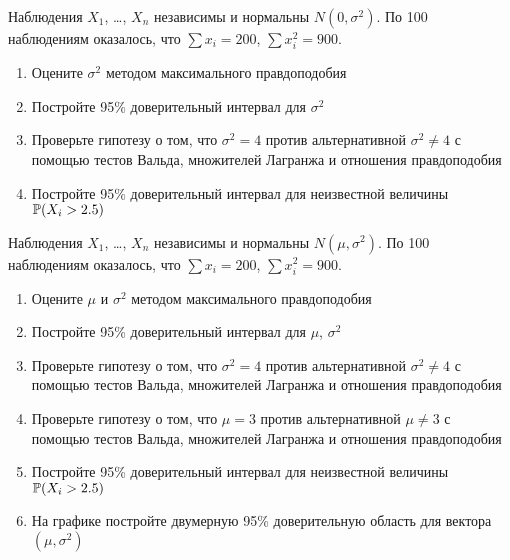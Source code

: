 \documentclass[pdftex,11pt,openany]{book}\usepackage[]{graphicx}\usepackage[]{color}
\begin{document}
\begin{solution}
\end{solution}


\begin{problem}
Наблюдения $X_1$, \ldots, $X_n$ независимы и нормальны $N(0,\sigma^2)$. По 100 наблюдениям оказалось, что $\sum x_i=200$, $\sum x_i^2=900$.
\begin{enumerate}
\item Оцените $\sigma^2$ методом максимального правдоподобия
\item Постройте 95\% доверительный интервал для $\sigma^2$
\item Проверьте гипотезу о том, что $\sigma^2=4$ против альтернативной $\sigma^2\neq 4$ с помощью тестов Вальда, множителей Лагранжа и отношения правдоподобия
\item Постройте 95\% доверительный интервал для неизвестной величины $\P(X_i>2.5)$
\end{enumerate}
\end{problem}

\begin{solution}
\end{solution}

\begin{problem} 
Наблюдения $X_1$, \ldots, $X_n$ независимы и нормальны $N(\mu,\sigma^2)$. По 100 наблюдениям оказалось, что $\sum x_i=200$, $\sum x_i^2=900$.
\begin{enumerate}
\item Оцените $\mu$ и $\sigma^2$ методом максимального правдоподобия
\item Постройте 95\% доверительный интервал для $\mu$, $\sigma^2$
\item \useR Проверьте гипотезу о том, что $\sigma^2=4$ против альтернативной $\sigma^2\neq 4$ с помощью тестов Вальда, множителей Лагранжа и отношения правдоподобия
\item \useR Проверьте гипотезу о том, что $\mu=3$ против альтернативной $\mu\neq 3$ с помощью тестов Вальда, множителей Лагранжа и отношения правдоподобия
\item \useR Постройте 95\% доверительный интервал для неизвестной величины $\P(X_i>2.5)$
\item \useR На графике постройте двумерную 95\% доверительную область для вектора $(\mu,\sigma^2)$
\end{enumerate}
\end{problem}

\begin{solution}
\end{solution}
\end{document}

